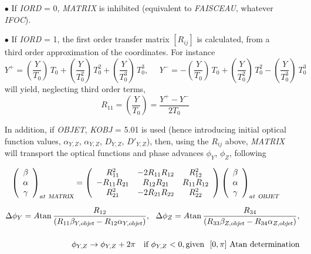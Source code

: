 \begin{itemize}
\item[$\bullet$] If \textsl{IORD} = 0, \textsl{MATRIX}  is inhibited (equivalent to 
\textsl{FAISCEAU}, whatever \textsl{IFOC}). 

\item[$\bullet$] If \textsl{IORD} = 1, the first order transfer matrix 
$ [R_{ij}]$ is calculated, from a third order approximation of the coordinates. For instance 
$$  Y^+    =   \left( \dfrac{Y}{T_0} \right)\, T_0
	             + \left(\dfrac{Y }{ T^2_0} \right)\, T^2_0 
	             + \left(\dfrac{Y }{ T^3_0} \right)\, T^3_0,   ~ ~ ~ ~ ~ ~ 
	 Y^-    =    - \left(\dfrac{Y }{ T_0} \right)\, T_0 
	             + \left(\dfrac{Y }{ T^2_0} \right)\, T^2_0 -
	             \left(\dfrac{Y }{ T^3_0} \right)\ T^3_0 $$
\noindent will yield, neglecting third order terms, 
$$          R_{11} = \left(\dfrac{Y }{ T_0} \right) = \dfrac{Y^+-Y^- }{ 2T_0} $$

\smallskip 

In addition, if \textsl{OBJET}, \textsl{KOBJ} = 5.01 is used (hence introducing initial optical function values, 
$\alpha_{Y,Z}$, $\alpha_{Y,Z}$, $D_{Y,Z}$, $D'_{Y,Z}$), 
then, using the $R_{ij}$ above,  \textsl{MATRIX} will transport  the  optical functions and phase advances 
$\phi_Y$, $\phi_Z$, following

\begin{equation}
\left(
\begin{array}{c}
\beta \\
\alpha \\
\gamma \\
\end{array}
\right)_{at~\textsl{MATRIX}}
=
\left(
\begin{array}{ccc}
R_{11}^2      &  -2R_{11}R_{12} &  R_{12}^2 \\
-R_{11}R_{21} &  R_{12}R_{21} &  R_{11}R_{12} \\
R_{21}^2      &  -2R_{21}R_{22} &  R_{22}^2 \\
\end{array}
\right)
\left(
\begin{array}{c}
\beta \\
\alpha \\
\gamma \\
\end{array}
\right)_{at~\textsl{OBJET}}       \nonumber
\end{equation}

\begin{eqnarray}
\Delta \phi_Y =  A\!\tan \dfrac{R_{12}}{(R_{11}\beta_{Y,\textsl{objet}} - R_{12}\alpha_{Y,\textsl{objet}})}, ~ ~ \Delta \phi_Z =  A\!\tan\dfrac{R_{34}}{(R_{33}\beta_{Z,\textsl{objet}} - R_{34}\alpha_{Z,\textsl{objet}})} , \\[3ex]
~ ~ ~   \phi_{Y, Z} \rightarrow \phi_{Y,Z} + 2 \pi ~ ~ ~ 
\textrm{if} ~ \phi_{Y,Z} < 0, \textrm{given} ~ ~ [0,\pi] \textrm{ Atan determination}   \nonumber
\end{eqnarray}


\end{itemize}
